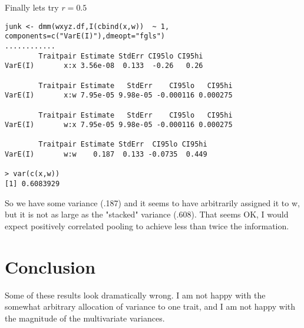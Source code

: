 \documentclass{report}  %
\begin{document}
Finally lets try $r=0.5$
\begin{verbatim}
junk <- dmm(wxyz.df,I(cbind(x,w))  ~ 1, components=c("VarE(I)"),dmeopt="fgls")
............
        Traitpair Estimate StdErr CI95lo CI95hi
VarE(I)       x:x 3.56e-08  0.133  -0.26   0.26

        Traitpair Estimate   StdErr    CI95lo   CI95hi
VarE(I)       x:w 7.95e-05 9.98e-05 -0.000116 0.000275

        Traitpair Estimate   StdErr    CI95lo   CI95hi
VarE(I)       w:x 7.95e-05 9.98e-05 -0.000116 0.000275

        Traitpair Estimate StdErr  CI95lo CI95hi
VarE(I)       w:w    0.187  0.133 -0.0735  0.449

> var(c(x,w))
[1] 0.6083929
\end{verbatim}
 So we have some variance (.187) and it seems to have arbitrarily assigned it to w, but it is not as large as the "stacked" variance (.608). That seems OK, I would expect positively correlated pooling to achieve less than twice the information. 

\section{Conclusion}
Some of these results look dramatically wrong. I am not happy with the somewhat arbitrary allocation of variance to one trait, and I am not happy with the magnitude of the multivariate variances. 
\end{document}
